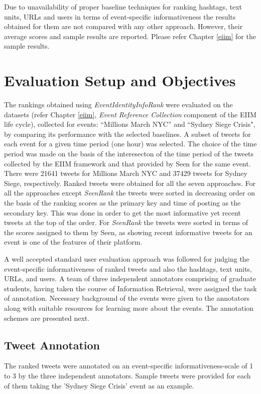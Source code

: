 Due to unavailability of proper baseline techniques for ranking hashtags, text units, URLs and users in terms of event-specific informativeness the results obtained for them are not compared with any other approach. However, their average scores and sample results are reported. Please refer Chapter \ref{eiim} for the sample results.

\section{Evaluation Setup and Objectives}
The rankings obtained using \textit{EventIdentityInfoRank} were evaluated on the  datasets (refer Chapter \ref{eiim}, \textit{Event Reference Collection} component of the EIIM life cycle), collected for events: ``Millions March NYC'' and ``Sydney Siege Crisis", by comparing its performance with the selected baselines. A subset of tweets for each event for a given time period (one hour) was selected. The choice of the time period was made on the basis of the interesecton of the time period of the tweets collected by the EIIM framework and that provided by Seen for the same event. There were 21641 tweets for Millions March NYC and 37429 tweets for Sydney Siege, respectively. Ranked tweets were obtained for all the seven approaches. For all the approaches except \textit{SeenRank} the tweets were sorted in decreasing order on the basis of the ranking scores as the primary key and time of posting as the secondary key. This was done in order to get the most informative yet recent tweets at the top of the order. For \textit{SeenRank} the tweets were sorted in terms of the scores assigned to them by Seen, as showing recent informative tweets for an event is one of the features of their platform.

A well accepted standard user evaluation approach was followed for judging the event-specific informativeness of ranked tweets and also the hashtags, text units, URLs, and users.  A team of three independent annotators comprising of graduate students, having taken the course of Information Retrieval, were assigned the task of annotation. Necessary background of the events were given to the annotators along with suitable resources for learning more about the events. The annotation schemes are presented next.


\subsection{Tweet Annotation} 
The ranked tweets were annotated on an event-specific informativeness-scale of 1 to 3 by the three independent annotators. Sample tweets were provided for each of them taking the 'Sydney Siege Crisis' event as an example. 

